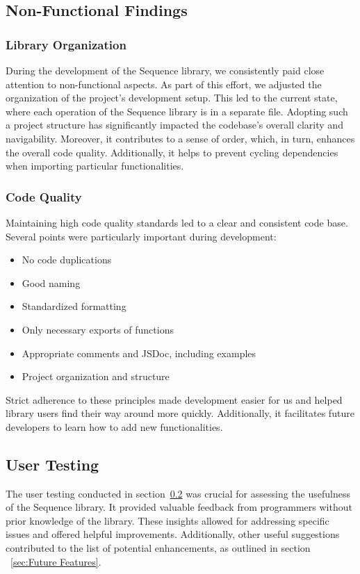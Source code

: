 \subsection{Non-Functional Findings}
\label{sub:Non-Functional Aspects}
\subsubsection{Library Organization}
\label{subsub:Library Organisation}
During the development of the Sequence library, we consistently paid close
attention to non-functional aspects. As part of this effort, we adjusted the
organization of the project's development setup. This led to the current state,
where each operation of the Sequence library is in a separate file. Adopting
such a project structure has significantly impacted the codebase's overall
clarity and navigability. Moreover, it contributes to a sense of order, which,
in turn, enhances the overall code quality. Additionally, it helps to prevent
cycling dependencies when importing particular functionalities.
\subsubsection{Code Quality}
\label{subsub:Code Quality}
Maintaining high code quality standards led to a clear and consistent
code base. Several points were particularly important during development:
\begin{itemize}
  \item{No code duplications}
  \item{Good naming}
  \item{Standardized formatting}
  \item{Only necessary exports of functions}
  \item{Appropriate comments and JSDoc, including examples}
  \item{Project organization and structure}
\end{itemize}

Strict adherence to these principles made development easier for us and helped
library users find their way around more quickly. Additionally, it facilitates
future developers to learn how to add new functionalities.

\subsection{User Testing}
\label{sub:User Testing}
The user testing conducted in section~\ref{sub:User Testing} was crucial for
assessing the usefulness of the Sequence library. It provided valuable feedback
from programmers without prior knowledge of the library. These insights allowed
for addressing specific issues and offered helpful improvements. Additionally,
other useful suggestions contributed to the list of potential enhancements, as
outlined in section ~\ref{sec:Future Features}.
